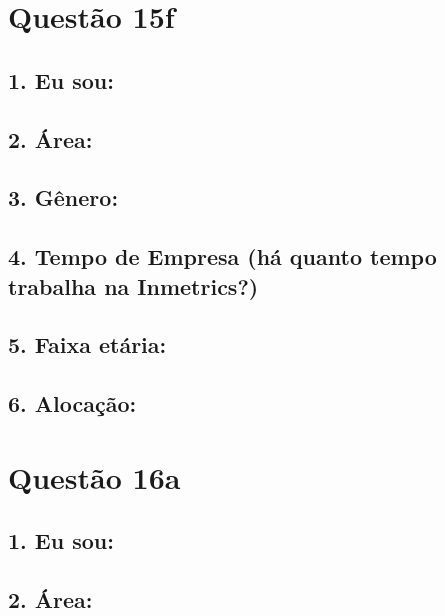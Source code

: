 \documentclass[]{book}
\begin{document}
\hypertarget{questao-15f}{%
\section{Questão 15f}\label{questao-15f}}

\hypertarget{eu-sou-28}{%
\subsection{1. Eu sou:}\label{eu-sou-28}}

\hypertarget{area-28}{%
\subsection{2. Área:}\label{area-28}}

\hypertarget{genero-28}{%
\subsection{3. Gênero:}\label{genero-28}}

\hypertarget{tempo-de-empresa-ha-quanto-tempo-trabalha-na-inmetrics-28}{%
\subsection{4. Tempo de Empresa (há quanto tempo trabalha na Inmetrics?)}\label{tempo-de-empresa-ha-quanto-tempo-trabalha-na-inmetrics-28}}

\hypertarget{faixa-etaria-28}{%
\subsection{5. Faixa etária:}\label{faixa-etaria-28}}

\hypertarget{alocacao-28}{%
\subsection{6. Alocação:}\label{alocacao-28}}

\hypertarget{questao-16a}{%
\section{Questão 16a}\label{questao-16a}}

\hypertarget{eu-sou-29}{%
\subsection{1. Eu sou:}\label{eu-sou-29}}

\hypertarget{area-29}{%
\subsection{2. Área:}\label{area-29}}
\end{document}
